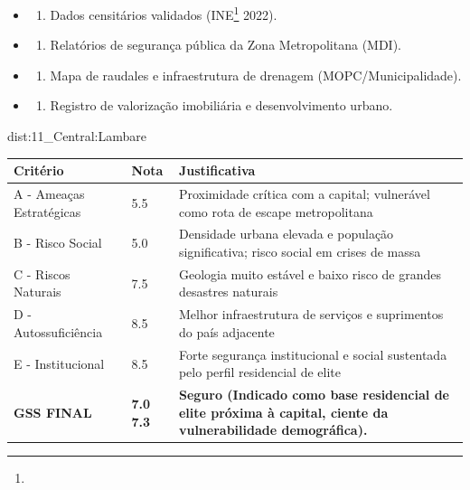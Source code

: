 {\begin{itemize}
\tightlist
\item
  \begin{enumerate}
  \def\labelenumi{\arabic{enumi})}
  \tightlist
  \item
    Dados censitários validados (INE\footnote{\fineINE} 2022).
  \end{enumerate}
\item
  \begin{enumerate}
  \def\labelenumi{\arabic{enumi})}
  \setcounter{enumi}{1}
  \tightlist
  \item
    Relatórios de segurança pública da Zona Metropolitana (MDI).
  \end{enumerate}
\item
  \begin{enumerate}
  \def\labelenumi{\arabic{enumi})}
  \setcounter{enumi}{2}
  \tightlist
  \item
    Mapa de raudales e infraestrutura de drenagem (MOPC/\allowbreak Municipalidade).
  \end{enumerate}
\item
  \begin{enumerate}
  \def\labelenumi{\arabic{enumi})}
  \setcounter{enumi}{3}
  \tightlist
  \item
    Registro de valorização imobiliária e desenvolvimento urbano.
  \end{enumerate}
\end{itemize}}{dist:11_Central:Lambare}
\begin{table}[ht!]
\small \begin{tabular}{p{3.0cm}p{0.8cm}p{6.0cm}} \toprule
\textbf{Critério} & \textbf{Nota} & \textbf{Justificativa} \\ \midrule
A - Ameaças Estratégicas & 5.5 & Proximidade crítica com a capital; vulnerável como rota de escape metropolitana \\
B - Risco Social & 5.0 & Densidade urbana elevada e população significativa; risco social em crises de massa \\
C - Riscos Naturais & 7.5 & Geologia muito estável e baixo risco de grandes desastres naturais \\
D - Autossuficiência & 8.5 & Melhor infraestrutura de serviços e suprimentos do país adjacente \\
E - Institucional & 8.5 & Forte segurança institucional e social sustentada pelo perfil residencial de elite \\
\midrule \textbf{GSS FINAL} & \textbf{7.0
7.3} & \textbf{Seguro (Indicado como base residencial de elite próxima à capital, ciente da vulnerabilidade demográfica).} \\ \bottomrule \end{tabular}
\end{table}
